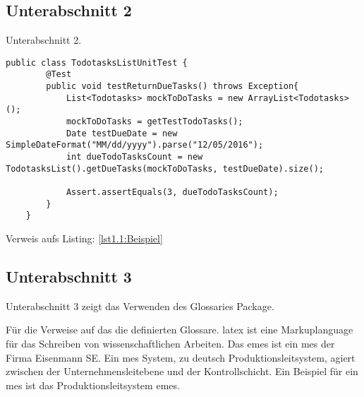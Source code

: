 \subsection{Unterabschnitt 2}

Unterabschnitt 2.

\begin{lstlisting}[label=lst1.1:Beispiel, caption={[Kurztext fürs Inhaltsverzeichnis]Beispielblock für Code. Syntax-Highlighting etc. kann unter ,,Document`` -> ,,Settings`` -> ,,\protect\LaTeX{} Preamble`` konfiguriert werden.}, captionpos=b]
    public class TodotasksListUnitTest {
        @Test
        public void testReturnDueTasks() throws Exception{
            List<Todotasks> mockToDoTasks = new ArrayList<Todotasks>();
            mockToDoTasks = getTestTodoTasks();
            Date testDueDate = new SimpleDateFormat("MM/dd/yyyy").parse("12/05/2016");
            int dueTodoTasksCount = new TodotasksList().getDueTasks(mockToDoTasks, testDueDate).size();

            Assert.assertEquals(3, dueTodoTasksCount);
        }
    }
\end{lstlisting}
Verweis aufs Listing: \ref{lst1.1:Beispiel}

\subsection{Unterabschnitt 3}

Unterabschnitt 3 zeigt das Verwenden des Glossaries Package.\newline

Für die Verweise auf das die definierten Glossare. \Gls{latex} ist eine Markuplanguage für das Schreiben von wissenschaftlichen Arbeiten. Das \acrfull{emes} ist ein \acrfull{mes} der Firma Eisenmann SE. Ein \acrshort{mes} System, zu deutsch Produktionsleitsystem, agiert zwischen der Unternehmensleitebene und der Kontrollschicht. Ein Beispiel für ein \acrlong{mes} ist das Produktionsleitsystem \acrshort{emes}.